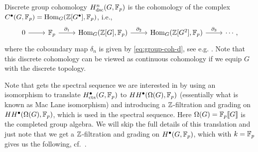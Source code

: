 Discrete group cohomology $H_{\mathrm{dsc}}^{n}(G,\mathbb{F}_{p})$ is the cohomology of the complex $C^{\bullet}(G,\mathbb{F}_{p}) = \operatorname{Hom}_{G}(\mathbb{Z}[G^{\bullet}],\mathbb{F}_{p})$, i.e.,
\[
  \begin{tikzcd}
    0 \ar[r] & \F_{p} \ar[r,"\partial_{1}"] & \Hom_G(\Z[G],\F_p) \ar[r,"\partial_{2}"] & \Hom_G(\Z[G^2],\F_p) \ar[r,"\partial_{3}"] & \cdots,
  \end{tikzcd}
\]
where the coboundary map $\delta_{n}$ is given by \eqref{eq:group-coh-d}, see e.g. \cite[Chap.~VII]{Ser}. Note that this discrete cohomology can be viewed as continuous cohomology if we equip $G$ with the discrete topology.


Note that \cite{Sor} gets the spectral sequence we are interested in by using an isomorphism to translate $H_{\mathrm{cts}}^{\bullet}(G,\mathbb{F}_{p})$ to $HH^{\bullet}(\Omega(G),\mathbb{F}_{p})$ (essentially what is known as Mac Lane isomorphism) and introducing a $\mathbb{Z}$-filtration and grading on $HH^{\bullet}(\Omega(G),\mathbb{F}_{p})$, which is used in the spectral sequence. Here $\Omega(G) = \mathbb{F}_{p}\llbracket G \rrbracket$ is the completed group algebra. We will skip the full details of this translation and just note that we get a $\mathbb{Z}$-filtration and grading on $H^{\bullet}(G,\mathbb{F}_{p})$, which with $k=\mathbb{F}_{p}$ gives us the following, cf.\ \cite[Thm.~5.5--§6.1]{Sor}.


